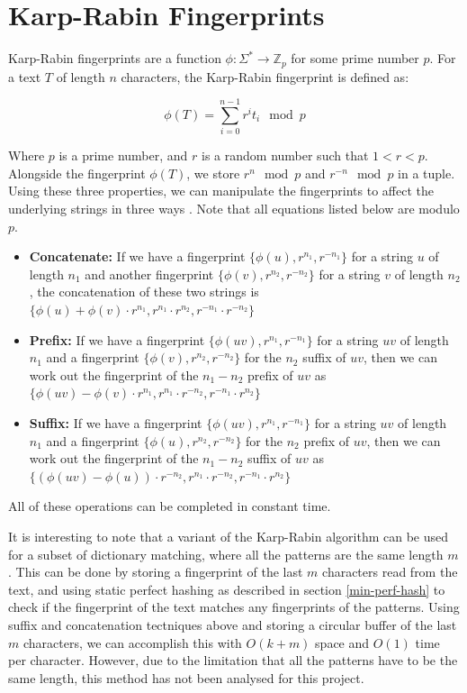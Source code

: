 \documentclass[ %
                    author={Dominic Joseph Moylett},
                    degree={MEng},
                     title={Dictionary Matching with Fingerprints},
                  subtitle={An Empirical Analysis},
                      type={research},
                      year={2015} ]{dissertation}
\begin{document}
\section{Karp-Rabin Fingerprints}
\label{sec:kr-fingerprints}

Karp-Rabin fingerprints \cite{5390135} are a function $\phi : \Sigma^* \to \mathbb{Z}_p$ for some prime number $p$. For a text $T$ of length $n$ characters, the Karp-Rabin fingerprint is defined as:

$$\phi(T) = \sum_{i = 0}^{n - 1} r^it_i \mod p$$

Where $p$ is a prime number, and $r$ is a random number such that $1 < r < p$. Alongside the fingerprint $\phi(T)$, we store $r^n \mod p$ and $r^{-n} \mod p$ in a tuple. Using these three properties, we can manipulate the fingerprints to affect the underlying strings in three ways \cite{5438620}. Note that all equations listed below are modulo $p$.

\begin{itemize}
  \item \textbf{Concatenate:} If we have a fingerprint $\{\phi(u), r^{n_1}, r^{-n_1}\}$ for a string $u$ of length $n_1$ and another fingerprint $\{\phi(v), r^{n_2}, r^{-n_2}\}$ for a string $v$ of length $n_2$, the concatenation of these two strings is $\{\phi(u) + \phi(v)\cdot r^{n_1}, r^{n_1} \cdot r^{n_2}, r^{-n_1} \cdot r^{-n_2}\}$
  \item \textbf{Prefix:} If we have a fingerprint $\{\phi(uv), r^{n_1}, r^{-n_1}\}$ for a string $uv$ of length $n_1$ and a fingerprint $\{\phi(v), r^{n_2}, r^{-n_2}\}$ for the $n_2$ suffix of $uv$, then we can work out the fingerprint of the $n_1 - n_2$ prefix of $uv$ as $\{\phi(uv) - \phi(v)\cdot r^{n_1}, r^{n_1} \cdot r^{-n_2}, r^{-n_1} \cdot r^{n_2}\}$
  \item \textbf{Suffix:} If we have a fingerprint $\{\phi(uv), r^{n_1}, r^{-n_1}\}$ for a string $uv$ of length $n_1$ and a fingerprint $\{\phi(u), r^{n_2}, r^{-n_2}\}$ for the $n_2$ prefix of $uv$, then we can work out the fingerprint of the $n_1 - n_2$ suffix of $uv$ as $\{(\phi(uv) - \phi(u))\cdot r^{-n_2}, r^{n_1} \cdot r^{-n_2}, r^{-n_1} \cdot r^{n_2}\}$
\end{itemize}

All of these operations can be completed in constant time.

It is interesting to note that a variant of the Karp-Rabin algorithm can be used for a subset of dictionary matching, where all the patterns are the same length $m$ \cite{candan:data}. This can be done by storing a fingerprint of the last $m$ characters read from the text, and using static perfect hashing as described in section \ref{min-perf-hash} to check if the fingerprint of the text matches any fingerprints of the patterns. Using suffix and concatenation tectniques above and storing a circular buffer of the last $m$ characters, we can accomplish this with $O(k + m)$ space and $O(1)$ time per character. However, due to the limitation that all the patterns have to be the same length, this method has not been analysed for this project.
\end{document}
